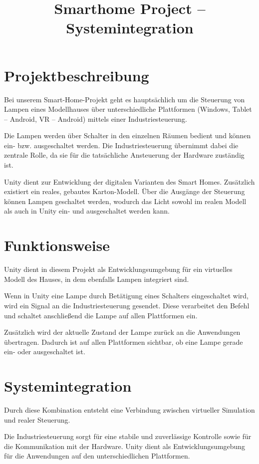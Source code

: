\documentclass[a4paper,12pt]{article}
\title{Smarthome Project – Systemintegration}
\author{}
\date{}
\begin{document}
\maketitle

\section{Projektbeschreibung}

Bei unserem Smart-Home-Projekt geht es hauptsächlich um die Steuerung von Lampen eines Modellhauses über unterschiedliche Plattformen (Windows, Tablet – Android, VR – Android) mittels einer Industriesteuerung.

Die Lampen werden über Schalter in den einzelnen Räumen bedient und können ein- bzw. ausgeschaltet werden. Die Industriesteuerung übernimmt dabei die zentrale Rolle, da sie für die tatsächliche Ansteuerung der Hardware zuständig ist.

Unity dient zur Entwicklung der digitalen Varianten des Smart Homes. Zusätzlich existiert ein reales, gebautes Karton-Modell. Über die Ausgänge der Steuerung können Lampen geschaltet werden, wodurch das Licht sowohl im realen Modell als auch in Unity ein- und ausgeschaltet werden kann.

\section{Funktionsweise}

Unity dient in diesem Projekt als Entwicklungsumgebung für ein virtuelles Modell des Hauses, in dem ebenfalls Lampen integriert sind.

Wenn in Unity eine Lampe durch Betätigung eines Schalters eingeschaltet wird, wird ein Signal an die Industriesteuerung gesendet. Diese verarbeitet den Befehl und schaltet anschließend die Lampe auf allen Plattformen ein.

Zusätzlich wird der aktuelle Zustand der Lampe zurück an die Anwendungen übertragen. Dadurch ist auf allen Plattformen sichtbar, ob eine Lampe gerade ein- oder ausgeschaltet ist.

\section{Systemintegration}

Durch diese Kombination entsteht eine Verbindung zwischen virtueller Simulation und realer Steuerung.

Die Industriesteuerung sorgt für eine stabile und zuverlässige Kontrolle sowie für die Kommunikation mit der Hardware. Unity dient als Entwicklungsumgebung für die Anwendungen auf den unterschiedlichen Plattformen.
\end{document}
